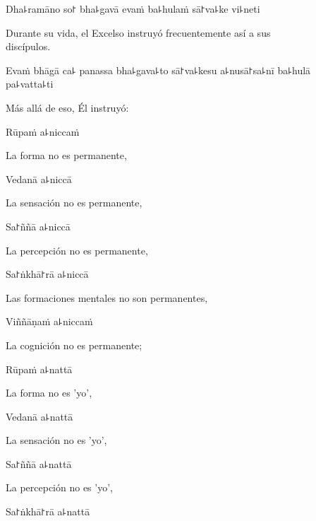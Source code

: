 Dha꜕ramāno so꜓ bha꜕gavā evaṁ ba꜕hulaṁ sā꜓va꜕ke vi꜕neti

\begin{english}
  Durante su vida, el Excelso instruyó frecuentemente así a sus\\ discípulos.
\end{english}

Evaṁ bhāgā ca꜕ panassa bha꜕gava꜕to sā꜓va꜕kesu a꜕nusā꜓sa꜕nī ba꜕hulā pa꜕vatta꜕ti

\begin{english}
  Más allá de eso, Él instruyó:
\end{english}


Rūpaṁ a꜕niccaṁ

\begin{english}
  La forma no es permanente,
\end{english}

Vedanā a꜕niccā

\begin{english}
  La sensación no es permanente,
\end{english}

Sa꜓ññā a꜕niccā

\begin{english}
  La percepción no es permanente,
\end{english}

Sa꜓ṅkhā꜓rā a꜕niccā

\begin{english}
  Las formaciones mentales no son permanentes,
\end{english}

Viññāṇaṁ a꜕niccaṁ

\begin{english}
  La cognición no es permanente;
\end{english}

Rūpaṁ a꜕nattā

\begin{english}
  La forma no es 'yo',
\end{english}

Vedanā a꜕nattā

\begin{english}
  La sensación no es 'yo',
\end{english}

Sa꜓ññā a꜕nattā

\begin{english}
  La percepción no es 'yo',
\end{english}

Sa꜓ṅkhā꜓rā a꜕nattā

